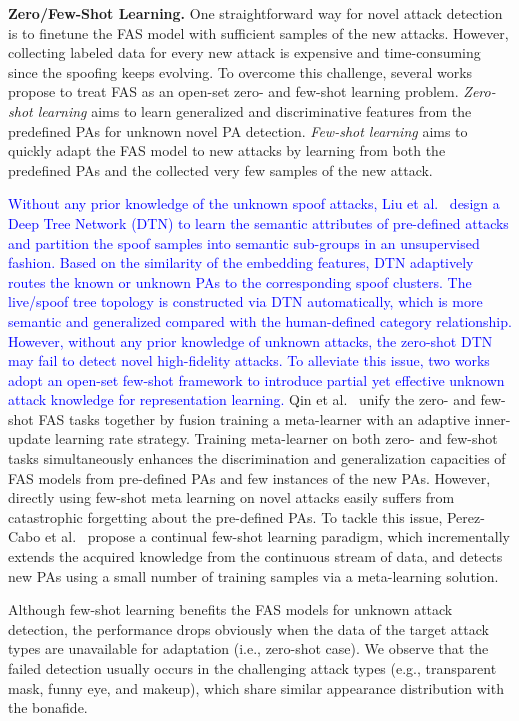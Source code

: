 \documentclass[10pt,journal,compsoc]{IEEEtran}
\begin{document}
\vspace{0.4em}
\noindent\textbf{Zero/Few-Shot Learning.}\quad   
One straightforward way for novel attack detection is to finetune the FAS model with sufficient samples of the new attacks. However, collecting labeled data for every new attack is expensive and time-consuming since the spoofing keeps evolving. To overcome this challenge, several works~\cite{liu2019deep,qin2019learning,perez2020learning} propose to treat FAS as an open-set zero- and few-shot learning problem. \textit{Zero-shot learning} aims to learn generalized and discriminative features from the predefined PAs for unknown novel PA detection. \textit{Few-shot learning} aims to quickly adapt the FAS model to new attacks by learning from both the predefined PAs and the collected very few samples of the new attack. 


\textcolor{blue}{Without any prior knowledge of the unknown spoof attacks, Liu et al.~\cite{liu2019deep} design a Deep Tree Network (DTN) to learn the semantic attributes of pre-defined attacks and partition the spoof samples into semantic sub-groups in an unsupervised fashion. Based on the similarity of the embedding features, DTN adaptively routes the known or unknown PAs to the corresponding spoof clusters. The live/spoof tree topology is constructed via DTN automatically, which is more semantic and generalized compared with the human-defined category relationship. However, without any prior knowledge of unknown attacks, the zero-shot DTN may fail to detect novel high-fidelity attacks. To alleviate this issue, two works adopt an open-set few-shot framework to introduce partial yet effective unknown attack knowledge for representation learning.} Qin et al.~\cite{qin2019learning} unify the zero- and few-shot FAS tasks together by fusion training a meta-learner with an adaptive inner-update learning rate strategy. Training meta-learner on both zero- and few-shot tasks simultaneously enhances the discrimination and generalization capacities of FAS models from pre-defined PAs and few instances of the new PAs. However, directly using few-shot meta learning on novel attacks easily suffers from catastrophic forgetting about the pre-defined PAs. To tackle this issue, Perez-Cabo et al.~\cite{perez2020learning} propose a continual few-shot learning paradigm, which incrementally extends the acquired knowledge from the continuous stream of data, and detects new PAs using a small number of training samples via a meta-learning solution.


Although few-shot learning benefits the FAS models for unknown attack detection, the performance drops obviously when the data of the target attack types are unavailable for adaptation (i.e., zero-shot case). We observe that the failed detection usually occurs in the challenging attack types (e.g., transparent mask, funny eye, and makeup), which share similar appearance distribution with the bonafide. 
\end{document}
